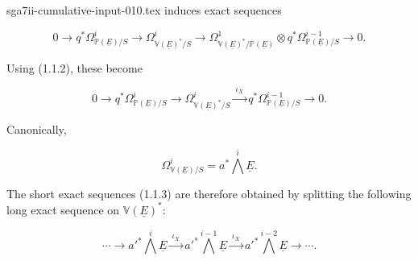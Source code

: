 \begin{filecontents*}{sga7ii-cumulative-input-010.tex}
induces exact sequences

\begin{equation*}
0\longrightarrow q^*\Omega^i_{\mathbb P(\underline E)/S}
\longrightarrow\Omega^i_{\mathbb V(\underline E)^*/S}
\longrightarrow
\Omega^1_{\mathbb V(\underline E)^*/\mathbb P(\underline E)}
\otimes q^*\Omega^{i-1}_{\mathbb P(\underline E)/S}
\longrightarrow0.
\end{equation*}

Using (1.1.2), these become

\begin{equation}\tag{1.1.3}
0\longrightarrow q^*\Omega^i_{\mathbb P(\underline E)/S}
\longrightarrow\Omega^i_{\mathbb V(\underline E)^*/S}
\xrightarrow{\ \iota_X\ }
q^*\Omega^{i-1}_{\mathbb P(\underline E)/S}
\longrightarrow0.
\end{equation}

Canonically,

\begin{equation}\tag{1.1.4}
\Omega^i_{\mathbb V(\underline E)/S}
=a^*\bigwedge^i\underline E.
\end{equation}

The short exact sequences (1.1.3) are therefore obtained by splitting the
following long exact sequence on $\mathbb V(\underline E)^*$:

\begin{equation}\tag{1.1.5}
\cdots\longrightarrow {a'}^*\bigwedge^i\underline E
\xrightarrow{\ \iota_X\ }
{a'}^*\bigwedge^{i-1}\underline E
\xrightarrow{\ \iota_X\ }
{a'}^*\bigwedge^{i-2}\underline E\longrightarrow\cdots.
\end{equation}

\end{filecontents*}
